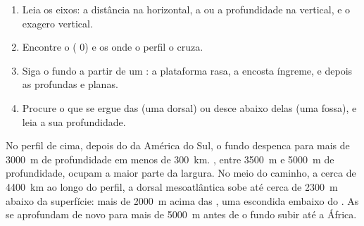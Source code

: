 \begin{method}
\begin{enumerate}
  \item Leia os eixos: a distância na horizontal, a  ou a
        profundidade na vertical, e o exagero vertical.
  \item Encontre o  ( 0) e os  onde o perfil o
        cruza.
  \item Siga o fundo a partir de um : a plataforma rasa, a encosta
        íngreme, e depois as  profundas e planas.
  \item Procure o que se ergue das  (uma dorsal) ou desce abaixo
        delas (uma fossa), e leia a sua profundidade.
\end{enumerate}
\end{method}

\begin{example}
No perfil de cima, depois do  da América do Sul, o fundo despenca
para mais de \qty{3000}{m} de profundidade em menos de \qty{300}{km}. , entre
\qty{3500}{m} e \qty{5000}{m} de profundidade, ocupam a maior parte da
largura. No meio do caminho, a cerca de \qty{4400}{km} ao longo do perfil,
a dorsal mesoatlântica sobe até cerca de \qty{2300}{m} abaixo da
superfície: mais de \qty{2000}{m} acima das , uma 
escondida embaixo do . As  se aprofundam de novo para mais de
\qty{5000}{m} antes de o fundo subir até a África.
\end{example}

